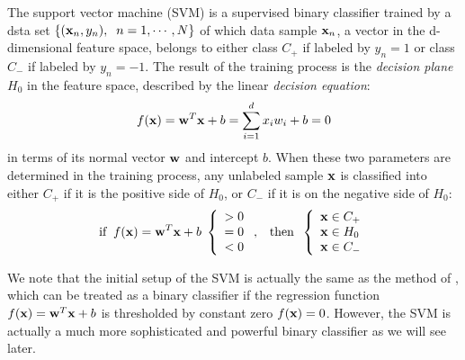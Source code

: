 \documentclass{article}
\begin{document}
The support vector machine (SVM) is a supervised binary classifier 
trained by a dsta set $\{ ({\bf x}_n, y_n),\;\;n=1,\cdots,N\}$ of 
which data sample ${\bf x}_n$, a vector in the d-dimensional feature 
space, belongs to either class $C_+$ if labeled by $y_n=1$ or class 
$C_-$ if labeled by $y_n=-1$. The result of the training process is 
the {\em decision plane} $H_0$ in the feature space, described by the
linear {\em decision equation}:
\begin{equation}
  f({\bf x})={\bf w}^T{\bf x}+b=\sum_{i=1}^d x_i w_i+b=0
\end{equation}
in terms of its normal vector ${\bf w}$ and intercept $b$. When these
two parameters are determined in the training process, any unlabeled
sample ${\bf x}$ is classified into either $C_+$ if it is the positive 
side of $H_0$, or $C_-$ if it is on the negative side of $H_0$:
\begin{equation} 
  \mbox{if} \;\;f({\bf x})={\bf w}^T{\bf x}+b\;
  \left\{ \begin{array}{l} >0 \\ =0\\ <0\end{array} \right.,
  \;\;\;\mbox{then}\;\;
  \left\{ \begin{array}{l} {\bf x}\in C_+ \\ {\bf x}\in H_0\\
    {\bf x}\in C_-\end{array} \right.
\end{equation}

We note that the initial setup of the SVM is actually the same as the
method of ,
which can be treated as a binary classifier if the regression function
$f({\bf x})={\bf w}^T{\bf x}+b$ is thresholded by constant zero 
$f({\bf x})=0$. However, the SVM is actually a much more sophisticated 
and powerful binary classifier as we will see later.

\end{document}
